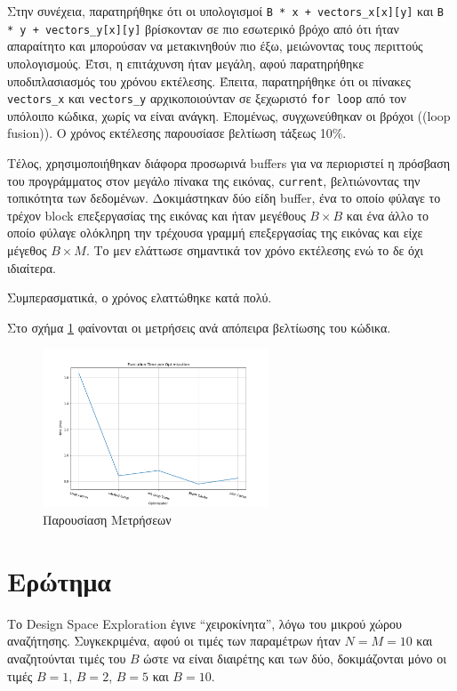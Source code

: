 \documentclass{article}
\newcommand{\eng}[1]{\foreignlanguage{english}{#1}} %
\begin{document}
Στην συνέχεια, παρατηρήθηκε ότι οι υπολογισμοί \texttt{\eng{B * x + vectors\_x[x][y]}}
και \texttt{\eng{B * y + vectors\_y[x][y]}} βρίσκονταν σε πιο εσωτερικό βρόχο από ότι
ήταν απαραίτητο και μπορούσαν να μετακινηθούν πιο έξω, μειώνοντας τους περιττούς
υπολογισμούς. Έτσι, η επιτάχυνση ήταν μεγάλη, αφού παρατηρήθηκε υποδιπλασιασμός του χρόνου εκτέλεσης.
Έπειτα, παρατηρήθηκε ότι οι πίνακες \texttt{\eng{vectors\_x}} και \texttt{\eng{vectors\_y}}
αρχικοποιούνταν σε ξεχωριστό \texttt{\eng{for loop}} από τον υπόλοιπο κώδικα, χωρίς να είναι
ανάγκη. Επομένως, συγχωνεύθηκαν οι βρόχοι (\eng(loop fusion)). Ο χρόνος εκτέλεσης
παρουσίασε βελτίωση τάξεως 10\%.

Τέλος, χρησιμοποιήθηκαν διάφορα προσωρινά \eng{buffers} για να περιοριστεί η πρόσβαση
του προγράμματος στον μεγάλο πίνακα της εικόνας, \texttt{\eng{current}},
βελτιώνοντας την τοπικότητα των δεδομένων. 
Δοκιμάστηκαν δύο είδη \eng{buffer}, ένα το οποίο φύλαγε το τρέχον \eng{block} επεξεργασίας
της εικόνας και ήταν μεγέθους $B \times B$ και ένα άλλο το οποίο
φύλαγε ολόκληρη την τρέχουσα γραμμή επεξεργασίας της εικόνας και
είχε μέγεθος $B \times M$. Το μεν ελάττωσε σημαντικά τον χρόνο εκτέλεσης
ενώ το δε όχι ιδιαίτερα.

Συμπερασματικά, ο χρόνος ελαττώθηκε κατά πολύ.

Στο σχήμα \ref{fig:measurements} φαίνονται οι μετρήσεις ανά απόπειρα βελτίωσης του κώδικα.

\begin{figure}[h]
    \centering
    \includegraphics[width=0.6\textwidth]{./plots/measurements.png}
    \caption{Παρουσίαση Μετρήσεων}
    \label{fig:measurements}
\end{figure}
\FloatBarrier

\section{Ερώτημα}

Το \eng{Design Space Exploration} έγινε ``χειροκίνητα'',
λόγω του μικρού χώρου αναζήτησης. Συγκεκριμένα, αφού οι τιμές
των παραμέτρων ήταν $N = M = 10$ και αναζητούνται τιμές του $B$
ώστε να είναι διαιρέτης και των δύο, δοκιμάζονται μόνο οι τιμές
$B = 1$, $B = 2$, $B = 5$ και $B = 10$.
\end{document}
